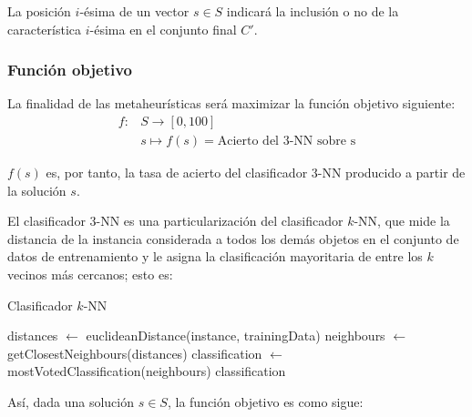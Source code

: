 \documentclass[a4paper, 11pt, titlepage]{article}
\begin{document}
    La posición $i$-ésima de un vector $s \in S$ indicará la inclusión o no de la característica $i$-ésima en el conjunto final $C'$.

    \subsubsection*{Función objetivo}
    La finalidad de las metaheurísticas será maximizar la función objetivo siguiente:
    \begin{align*}
        f \colon &S \to [0,100] \\
        &s \mapsto f(s) = \textrm{Acierto del 3-NN sobre s}
    \end{align*}

    $f(s)$ es, por tanto, la tasa de acierto del clasificador 3-NN producido a partir de la solución $s$.

    El clasificador 3-NN es una particularización del clasificador $k$-NN, que mide la distancia de la instancia considerada a todos los demás objetos en el conjunto de datos de entrenamiento y le asigna la clasificación mayoritaria de entre los $k$ vecinos más cercanos; esto es:

    \begin{algorithm}
        \caption{Clasificador $k$-NN}\label{knn}
        \begin{algorithmic}[1]
            \State distances $\gets$ euclideanDistance(instance, trainingData)
            \State neighbours $\gets$ getClosestNeighbours(distances)
            \State classification $\gets$ mostVotedClassification(neighbours)
            \State \Return classification
            \EndFunction
        \end{algorithmic}
    \end{algorithm}

    Así, dada una solución $s \in S$, la función objetivo es como sigue:
\end{document}
